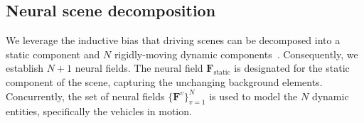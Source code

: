 


\subsection{Neural scene decomposition} \label{sec: decomposition}
We leverage the inductive bias that driving scenes can be decomposed into a static component and $N$ rigidly-moving dynamic components~\cite{huang2022dynamic,gojcic2021weakly}. Consequently, we establish $N+1$ neural fields. The neural field $\mathbf{F}_{\text{static}}$ is designated for the static component of the scene, capturing the unchanging background elements. Concurrently, the set of neural fields $\{\mathbf{F}^v\}_{v=1}^{N}$ is used to model the $N$ dynamic entities, specifically the vehicles in motion.



